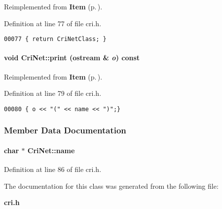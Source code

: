 Reimplemented from {\bf Item} {\rm (p.\,\pageref{Item_a3})}.

Definition at line 77 of file cri.h.\small\begin{verbatim}00077 { return CriNetClass; }
\end{verbatim}\normalsize 
\label{CriNet_a4}
\paragraph{\setlength{\rightskip}{0pt plus 5cm}void Cri\-Net::print (ostream \& {\em o}) const\hspace{0.3cm}{\tt  [inline, virtual]}}\hfill



Reimplemented from {\bf Item} {\rm (p.\,\pageref{Item_a8})}.

Definition at line 79 of file cri.h.\small\begin{verbatim}00080 { o << "(" << name << ")";}
\end{verbatim}\normalsize 


\subsubsection{Member Data Documentation}
\label{CriNet_m0}
\paragraph{\setlength{\rightskip}{0pt plus 5cm}char $\ast$ Cri\-Net::name}\hfill



Definition at line 86 of file cri.h.

The documentation for this class was generated from the following file:\begin{CompactItemize}
\item 
{\bf cri.h}\end{CompactItemize}
